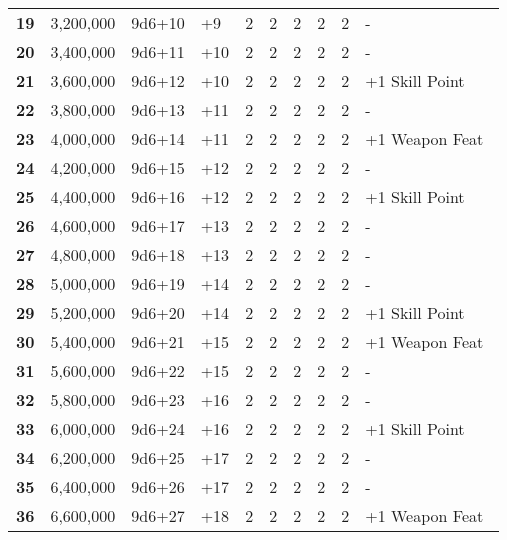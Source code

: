\begin {table}[H]
\begin{tabularx}{\columnwidth}{>{\bfseries}cccM{.31in}M{.51in}M{.25in}M{.43in}M{.32in}M{.45in}Y}
		19 & 3,200,000 & 9d6+10 & +9 & 2 & 2 & 2 & 2 & 2 & -\\
		20 & 3,400,000 & 9d6+11 & +10 & 2 & 2 & 2 & 2 & 2 & -\\
		21 & 3,600,000 & 9d6+12 & +10 & 2 & 2 & 2 & 2 & 2 & +1 Skill Point\\
		22 & 3,800,000 & 9d6+13 & +11 & 2 & 2 & 2 & 2 & 2 & -\\
		23 & 4,000,000 & 9d6+14 & +11 & 2 & 2 & 2 & 2 & 2 & +1 Weapon Feat\\
		24 & 4,200,000 & 9d6+15 & +12 & 2 & 2 & 2 & 2 & 2 & -\\
		25 & 4,400,000 & 9d6+16 & +12 & 2 & 2 & 2 & 2 & 2 & +1 Skill Point\\
		26 & 4,600,000 & 9d6+17 & +13 & 2 & 2 & 2 & 2 & 2 & -\\
		27 & 4,800,000 & 9d6+18 & +13 & 2 & 2 & 2 & 2 & 2 & -\\
		28 & 5,000,000 & 9d6+19 & +14 & 2 & 2 & 2 & 2 & 2 & -\\
		29 & 5,200,000 & 9d6+20 & +14 & 2 & 2 & 2 & 2 & 2 & +1 Skill Point\\
		30 & 5,400,000 & 9d6+21 & +15 & 2 & 2 & 2 & 2 & 2 & +1 Weapon Feat\\
		31 & 5,600,000 & 9d6+22 & +15 & 2 & 2 & 2 & 2 & 2 & -\\
		32 & 5,800,000 & 9d6+23 & +16 & 2 & 2 & 2 & 2 & 2 & -\\
		33 & 6,000,000 & 9d6+24 & +16 & 2 & 2 & 2 & 2 & 2 & +1 Skill Point\\
		34 & 6,200,000 & 9d6+25 & +17 & 2 & 2 & 2 & 2 & 2 & -\\
		35 & 6,400,000 & 9d6+26 & +17 & 2 & 2 & 2 & 2 & 2 & -\\
		36 & 6,600,000 & 9d6+27 & +18 & 2 & 2 & 2 & 2 & 2 & +1 Weapon Feat\
  \end {tabularx}
\end {table}
\newpage
